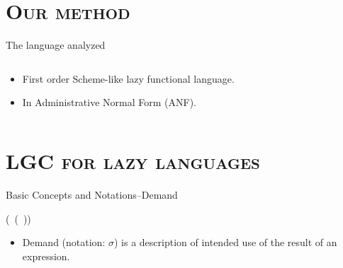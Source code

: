 \documentclass[xcolor=x11names,compress,mathserif]{beamer}
\renewcommand{\(}{\begin{columns}}
\renewcommand{\)}{\end{columns}}
\newcommand{\<}[1]{\begin{column}{#1}}
\renewcommand{\>}{\end{column}}
\begin{document}
\section{\scshape Our method}
\begin{frame}{The language analyzed}
\begin{columns}
  \begin{column}[T]{0.45\textwidth}
\small
    \begin{itemize} \itemsep0.75em
    \item First order Scheme-like lazy functional language.
    \item In Administrative Normal Form (ANF).
    \end{itemize}
\normalsize
  \end{column}
  \begin{column}[T]{0.55\textwidth}
    
  \end{column}
\end{columns}
\end{frame}
\section{\scshape LGC for lazy languages}
\begin{frame}{Basic Concepts and Notations--Demand}
  \begin{center}
     (\CAR\ (\CDR\ \pw)) \\
  \end{center}
  \pause
\centerline{}
  \begin{itemize}
  \item Demand  (notation: $\sigma$) is a description  of intended use
    of the result of an expression.
  \end{itemize}
\end{frame}

\end{document}
